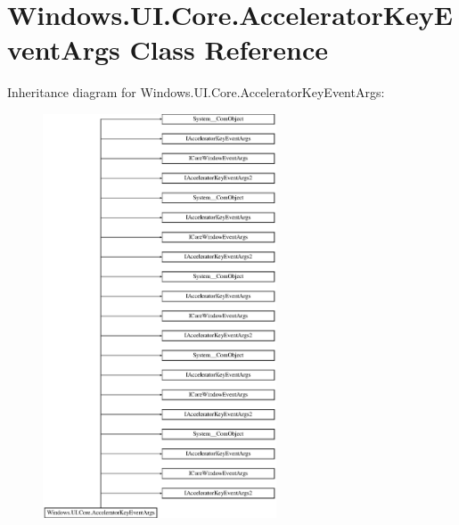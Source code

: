 \hypertarget{class_windows_1_1_u_i_1_1_core_1_1_accelerator_key_event_args}{}\section{Windows.\+U\+I.\+Core.\+Accelerator\+Key\+Event\+Args Class Reference}
\label{class_windows_1_1_u_i_1_1_core_1_1_accelerator_key_event_args}
Inheritance diagram for Windows.\+U\+I.\+Core.\+Accelerator\+Key\+Event\+Args\+:\begin{figure}[H]
\begin{center}
\leavevmode
\includegraphics[height=12.000000cm]{class_windows_1_1_u_i_1_1_core_1_1_accelerator_key_event_args}
\end{center}
\end{figure}
